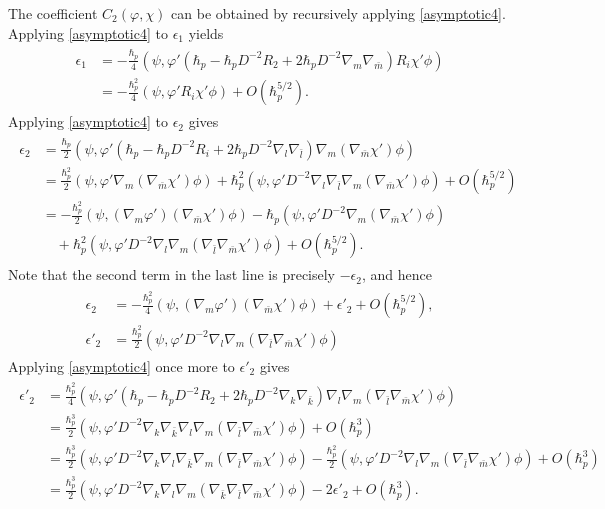 \documentclass[12pt]{article}
\newcommand\als[1]{\begin{align}\begin{split}#1\end{split}\end{align}}
\theoremstyle{definition} %
\theoremstyle{plain} %
\theoremstyle{remark} %
\theoremstyle{underline}
\begin{document}
The coefficient $C_2(\varphi,\chi)$ can be obtained by recursively applying
\eqref{asymptotic4}.
Applying \eqref{asymptotic4} to $\epsilon_1$ yields
\als{
\epsilon_1 &= - \frac{\hbar_p}{4}(\psi, \varphi' \left( \hbar_p - \hbar_p  D^{-2} R_2  + 2\hbar_p D^{-2}  \nabla_m \nabla_{\bar m} \right) R_i \chi' \phi)\\
&= - \frac{\hbar_p^2}{4}(\psi, \varphi' R_i \chi' \phi) + O(\hbar_p^{5/2}).
}
Applying \eqref{asymptotic4} to $\epsilon_2$ gives
\als{
\epsilon_2 &= \frac{\hbar_p}{2} (\psi, \varphi' \left( \hbar_p - \hbar_p  D^{-2} R_i + 2\hbar_p D^{-2} \nabla_l \nabla_{\bar l} \right) \nabla_m (\nabla_{\bar m} \chi') \phi)\\
&= \frac{\hbar_p^2}{2} (\psi, \varphi' \nabla_m (\nabla_{\bar m} \chi') \phi) + \hbar_p^2 (\psi, \varphi' D^{-2} \nabla_l \nabla_{\bar l} \nabla_m (\nabla_{\bar m} \chi') \phi) + O(\hbar_p^{5/2})\\
&= -\frac{\hbar_p^2}{2} (\psi, (\nabla_m \varphi') (\nabla_{\bar m} \chi') \phi) - \hbar_p  (\psi, \varphi' D^{-2} \nabla_m (\nabla_{\bar m} \chi') \phi)\\
& \quad + \hbar_p^2 (\psi, \varphi' D^{-2} \nabla_l \nabla_m (\nabla_{\bar l} \nabla_{\bar m} \chi') \phi) + O(\hbar_p^{5/2}).
}
Note that the second term in the last line is precisely $-\epsilon_2$, and hence
\als{
\epsilon_2 &= -\frac{\hbar_p^2}{4} (\psi, (\nabla_m \varphi') (\nabla_{\bar m} \chi') \phi) + \epsilon'_2 + O(\hbar_p^{5/2}),\\
\epsilon'_2 &= \frac{\hbar_p^2}{2} (\psi, \varphi' D^{-2} \nabla_l \nabla_m (\nabla_{\bar l} \nabla_{\bar m} \chi') \phi)
}
Applying \eqref{asymptotic4} once more to $\epsilon'_2$ gives
\als{
\epsilon'_2 &= \frac{\hbar_p^2}{4} (\psi, \varphi' \left( \hbar_p - \hbar_p  D^{-2} R_2 + 2\hbar_p D^{-2} \nabla_k \nabla_{\bar k} \right) \nabla_l \nabla_m (\nabla_{\bar l} \nabla_{\bar m} \chi') \phi)\\
&= \frac{\hbar_p^3}{2} (\psi, \varphi' D^{-2} \nabla_k \nabla_{\bar k} \nabla_l \nabla_m (\nabla_{\bar l} \nabla_{\bar m} \chi') \phi) + O(\hbar_p^3)\\
&= \frac{\hbar_p^3}{2} (\psi, \varphi'D^{-2} \nabla_k \nabla_l \nabla_{\bar k} \nabla_m (\nabla_{\bar l} \nabla_{\bar m} \chi') \phi) - \frac{\hbar_p^2}{2} (\psi, \varphi'  D^{-2} \nabla_l \nabla_m (\nabla_{\bar l} \nabla_{\bar m} \chi') \phi) + O(\hbar_p^3)\\
&= \frac{\hbar_p^3}{2} (\psi, \varphi'  D^{-2} \nabla_k \nabla_l \nabla_m (\nabla_{\bar k} \nabla_{\bar l} \nabla_{\bar m} \chi') \phi) - 2\epsilon'_2 + O(\hbar_p^3).
}
\end{document}
